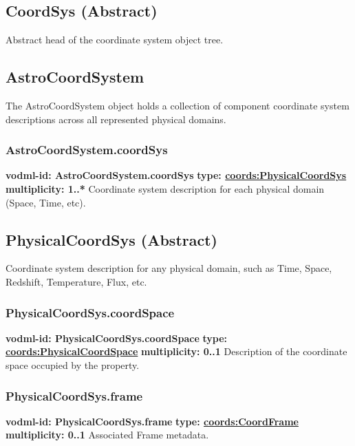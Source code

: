   \subsection{CoordSys (Abstract)}
  \label{sect:CoordSys}
    Abstract head of the coordinate system object tree.


  \subsection{AstroCoordSystem}
  \label{sect:AstroCoordSystem}
    The AstroCoordSystem object holds a collection of component coordinate system descriptions across all represented physical domains.

    \subsubsection{AstroCoordSystem.coordSys}
      \textbf{vodml-id: AstroCoordSystem.coordSys} \newline
      \textbf{type: \hyperref[sect:PhysicalCoordSys]{coords:PhysicalCoordSys}} \newline
      \textbf{multiplicity: 1..*} \newline 
      Coordinate system description for each physical domain (Space, Time, etc).

  \subsection{PhysicalCoordSys (Abstract)}
  \label{sect:PhysicalCoordSys}
    Coordinate system description for any physical domain, such as Time, Space, Redshift, Temperature, Flux, etc.

    \subsubsection{PhysicalCoordSys.coordSpace}
      \textbf{vodml-id: PhysicalCoordSys.coordSpace} \newline
      \textbf{type: \hyperref[sect:PhysicalCoordSpace]{coords:PhysicalCoordSpace}} \newline
      \textbf{multiplicity: 0..1} \newline 
      Description of the coordinate space occupied by the property.

    \subsubsection{PhysicalCoordSys.frame}
      \textbf{vodml-id: PhysicalCoordSys.frame} \newline
      \textbf{type: \hyperref[sect:CoordFrame]{coords:CoordFrame}} \newline
      \textbf{multiplicity: 0..1} \newline 
      Associated Frame metadata.

